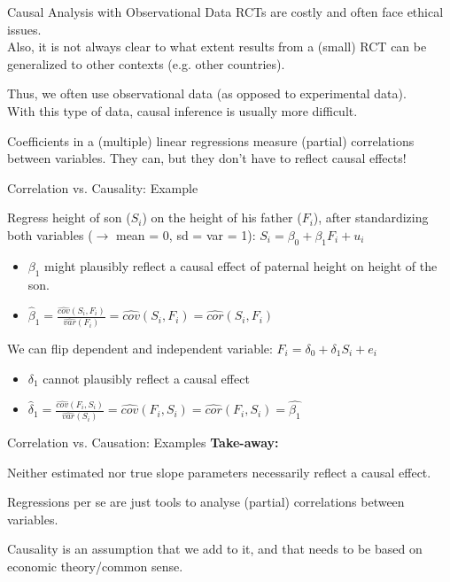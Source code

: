 \documentclass[11pt, aspectratio = 169]{beamer}
\begin{document}
\begin{frame}{Causal Analysis with Observational Data}
RCTs are costly and often face ethical issues. \\
Also, it is not always clear to what extent results from a (small) RCT can be generalized to other contexts (e.g. other countries).

Thus, we often use observational data (as opposed to experimental data).
\\
With this type of data, causal inference is usually more difficult.

Coefficients in a (multiple) linear regressions measure \alert{(partial) correlations} between variables.
\alert{They can, but they don’t have to reflect causal effects!}
\end{frame}

\begin{frame}{Correlation vs. Causality: Example}

Regress height of son ($S_i$) on the height of his father ($F_i$), after standardizing both variables ($\rightarrow$ mean = 0, sd = var = 1): $S_i = \beta_0 + \beta_1F_i + u_i$
\vspace{-0.15cm}
\begin{itemize}
    \item $\beta_1$ might plausibly reflect a causal effect of paternal height on height of the son. 
    \item $\hat{\beta}_1 = \frac{\widehat{cov}(S_i, F_i)}{\widehat{var}(F_i)} = \widehat{cov}(S_i, F_i) = \widehat{cor}(S_i, F_i) $
\end{itemize}
\pause
We can flip dependent and independent variable: $F_i = \delta_0 + \delta_1S_i + e_i$
\vspace{-0.15cm}

\begin{itemize}
    \item $\delta_1$ cannot plausibly reflect a causal effect
    \item $\hat{\delta}_1 = \frac{\widehat{cov}(F_i, S_i)}{\widehat{var}(S_i)} = \widehat{cov}(F_i, S_i) = \widehat{cor}(F_i, S_i) = \hat{\beta_1}$
\end{itemize}

\end{frame}


\begin{frame}{Correlation vs. Causation: Examples}
\color{teal}\textbf{Take-away:} 


\color{black} Neither estimated nor true slope parameters necessarily reflect a causal effect. 

Regressions per se are just tools to analyse (partial)  correlations between variables.


Causality is an assumption that we add to it, and that needs to be based on economic theory/common sense.
\end{frame}
\end{document}
